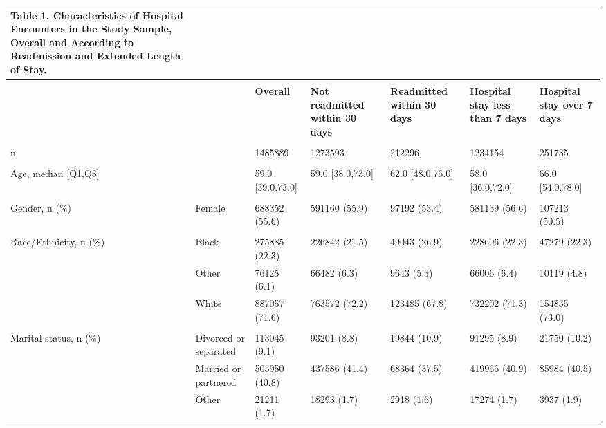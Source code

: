 %
\begin{adjustbox}{width={\textwidth},totalheight={\textheight},keepaspectratio,frame}%
\sffamily %
{%
\begin{tabular}{L{20em}C{10em}C{10em}C{10em}C{10em}C{10em}}%
{{\textbf{\color{NEJMRed} Table 1.}}%
\textbf{Characteristics  of Hospital Encounters in the Study Sample, Overall and According to Readmission and Extended Length of Stay.}}\\[10pt]%
\hline%
 & & & & & \\%
& \textbf{} & \textbf{Overall} & \textbf{Not readmitted within 30 days} & \textbf{Readmitted within 30 days} & \textbf{Hospital stay less than 7 days} & \textbf{Hospital stay over 7 days}\\\hline
 &  &  &  &  &  & \\
n &  & 1485889 & 1273593 & 212296 & 1234154 & 251735\\
 &  &  &  &  &  & \\
Age, median [Q1,Q3] &  & 59.0 [39.0,73.0] & 59.0 [38.0,73.0] & 62.0 [48.0,76.0] & 58.0 [36.0,72.0] & 66.0 [54.0,78.0]\\
 &  &  &  &  &  & \\
Gender, n (\%) & \hspace{3mm} Female & 688352 (55.6) & 591160 (55.9) & 97192 (53.4) & 581139 (56.6) & 107213 (50.5)\\
 &  &  &  &  &  & \\
Race/Ethnicity, n (\%) & \hspace{3mm} Black & 275885 (22.3) & 226842 (21.5) & 49043 (26.9) & 228606 (22.3) & 47279 (22.3)\\
 & \hspace{3mm} Other & 76125 (6.1) & 66482 (6.3) & 9643 (5.3) & 66006 (6.4) & 10119 (4.8)\\
 & \hspace{3mm} White & 887057 (71.6) & 763572 (72.2) & 123485 (67.8) & 732202 (71.3) & 154855 (73.0)\\
 &  &  &  &  &  & \\
Marital status, n (\%) & \hspace{3mm} Divorced or separated & 113045 (9.1) & 93201 (8.8) & 19844 (10.9) & 91295 (8.9) & 21750 (10.2)\\
 & \hspace{3mm} Married or partnered & 505950 (40.8) & 437586 (41.4) & 68364 (37.5) & 419966 (40.9) & 85984 (40.5)\\
 & \hspace{3mm} Other & 21211 (1.7) & 18293 (1.7) & 2918 (1.6) & 17274 (1.7) & 3937 (1.9)\\

\end{tabular}}
\end{adjustbox}
